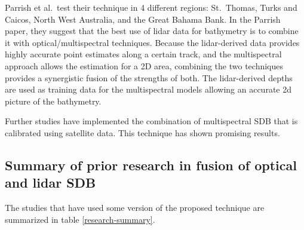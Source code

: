 Parrish et al.~test their technique in 4 different regions: St.~Thomas, Turks and Caicos, North West Australia, and the Great Bahama Bank. In the Parrish paper, they suggest that the best use of lidar data for bathymetry is to combine it with optical/multispectral techniques. Because the lidar-derived data provides highly accurate point estimates along a certain track, and the multispectral approach allows the estimation for a 2D area, combining the two techniques provides a synergistic fusion of the strengths of both. The lidar-derived depths are used as training data for the multispectral models allowing an accurate 2d picture of the bathymetry.

Further studies have implemented the combination of multispectral SDB that is calibrated using satellite data. This technique has shown promising results.

\subsection{Summary of prior research in fusion of optical and lidar SDB}

The studies that have used some version of the proposed technique are summarized in table \ref{research-summary}.


